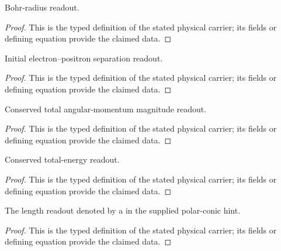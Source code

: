 \begin{definition}
  \label{def:physics:IPhO_2026_1_B_2:aux016}
  Bohr-radius readout.
\end{definition}
\begin{proof}
  This is the typed definition of the stated physical carrier; its fields or defining equation provide the claimed data.
\end{proof}

\begin{definition}
  \label{def:physics:IPhO_2026_1_B_2:aux017}
  Initial electron--positron separation readout.
\end{definition}
\begin{proof}
  This is the typed definition of the stated physical carrier; its fields or defining equation provide the claimed data.
\end{proof}

\begin{definition}
  \label{def:physics:IPhO_2026_1_B_2:aux018}
  Conserved total angular-momentum magnitude readout.
\end{definition}
\begin{proof}
  This is the typed definition of the stated physical carrier; its fields or defining equation provide the claimed data.
\end{proof}

\begin{definition}
  \label{def:physics:IPhO_2026_1_B_2:aux019}
  Conserved total-energy readout.
\end{definition}
\begin{proof}
  This is the typed definition of the stated physical carrier; its fields or defining equation provide the claimed data.
\end{proof}

\begin{definition}
  \label{def:physics:IPhO_2026_1_B_2:aux020}
  The length readout denoted by a in the supplied polar-conic hint.
\end{definition}
\begin{proof}
  This is the typed definition of the stated physical carrier; its fields or defining equation provide the claimed data.
\end{proof}

